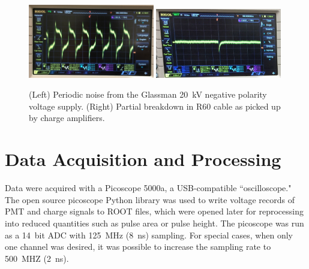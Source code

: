  \begin{figure}[htbp]
\begin{center}
\includegraphics[width = 0.49\textwidth, keepaspectratio]{figures/testbed/glassman_noise.png}
\includegraphics[width = 0.49\textwidth, keepaspectratio]{figures/testbed/partial_breakdown_pickup.png}
\caption{(Left) Periodic noise from the Glassman 20~kV negative polarity voltage supply. (Right) Partial breakdown in R60 cable as picked up by charge amplifiers.}
\label{fig:pickup_noise}
\end{center}
\end{figure}






\section{Data Acquisition and Processing}
Data were acquired with a Picoscope 5000a, a USB-compatible ``oscilloscope." The open source picoscope Python library was used to write voltage records of \ac{PMT} and charge signals to ROOT files, which were opened later for reprocessing into reduced quantities such as pulse area or pulse height. The picoscope was run as a 14~bit ADC with 125~MHz (8~ns) sampling. For special cases, when only one channel was desired, it was possible to increase the sampling rate to 500~MHZ (2~ns). 

